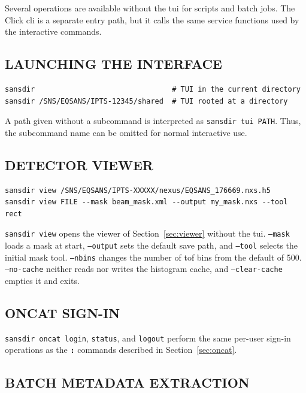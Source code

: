 \documentclass[tm]{ornltm}
\newcommand{\key}[1]{\textbf{\texttt{#1}}}
\begin{document}
Several operations are available without the \ac{tui} for scripts and batch
jobs. The Click \ac{cli} is a separate entry path, but it calls the same service
functions used by the interactive commands.

\subsection{LAUNCHING THE INTERFACE}

\begin{lstlisting}[language=shellsession]
sansdir                                # TUI in the current directory
sansdir /SNS/EQSANS/IPTS-12345/shared  # TUI rooted at a directory
\end{lstlisting}

A path given without a subcommand is interpreted as \texttt{sansdir tui PATH}.
Thus, the subcommand name can be omitted for normal interactive use.

\subsection{DETECTOR VIEWER}

\begin{lstlisting}[language=shellsession]
sansdir view /SNS/EQSANS/IPTS-XXXXX/nexus/EQSANS_176669.nxs.h5
sansdir view FILE --mask beam_mask.xml --output my_mask.nxs --tool rect
\end{lstlisting}

\texttt{sansdir view} opens the viewer of Section~\ref{sec:viewer} without the
\ac{tui}. \texttt{--mask} loads a mask at start, \texttt{--output} sets the
default save path, and \texttt{--tool} selects the initial mask tool.
\texttt{--nbins} changes the number of \ac{tof} bins from the default of 500.
\texttt{--no-cache} neither reads nor writes the histogram cache, and
\texttt{--clear-cache} empties it and exits.

\subsection{ONCAT SIGN-IN}

\texttt{sansdir oncat login}, \texttt{status}, and \texttt{logout} perform the
same per-user sign-in operations as the \key{:} commands described in
Section~\ref{sec:oncat}.

\subsection{BATCH METADATA EXTRACTION}
\end{document}
